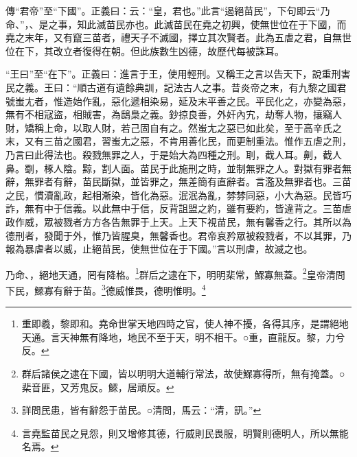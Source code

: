 {\noindent\zhuan{}\fzbyks 傳“君帝”至“下國”。正義曰：云：“皇，君也。”此言“遏絕苗民”，下句即云“乃命、”，、是之事，知此滅苗民亦也。此滅苗民在堯之初興，使無世位在于下國，而堯之末年，又有竄三苗者，禮天子不滅國，擇立其次賢者。此為五虐之君，自無世位在下，其改立者復得在朝。但此族數生凶德，故歷代每被誅耳。 \par}

{\noindent\shu{}\fzkt “王曰”至“在下”。正義曰：進言于王，使用輕刑。又稱王之言以告天下，說重刑害民之義。王曰：“順古道有遺餘典訓，記法古人之事。昔炎帝之末，有九黎之國君號蚩尢者，惟造始作亂，惡化遞相染易，延及末平善之民。平民化之，亦變為惡，無有不相寇盜，相賊害，為鴟梟之義。鈔掠良善，外奸內宄，劫奪人物，攘竊人財，矯稱上命，以取人財，若己固自有之。然蚩尢之惡已如此矣，至于高辛氏之末，又有三苗之國君，習蚩尢之惡，不肯用善化民，而更制重法。惟作五虐之刑，乃言曰此得法也。殺戮無罪之人，于是始大為四種之刑。刵，截人耳。劓，截人鼻。劅，椓人陰。黥，割人面。苗民于此施刑之時，並制無罪之人。對獄有罪者無辭，無罪者有辭，苗民斷獄，並皆罪之，無差簡有直辭者。言濫及無罪者也。三苗之民，慣瀆亂政，起相漸染，皆化為惡。泯泯為亂，棼棼同惡，小大為惡。民皆巧詐，無有中于信義。以此無中于信，反背詛盟之約，雖有要約，皆違背之。三苗虐政作威，眾被戮者方方各告無罪于上天。上天下視苗民，無有馨香之行。其所以為德刑者，發聞于外，惟乃皆腥臭，無馨香也。君帝哀矜眾被殺戮者，不以其罪，乃報為暴虐者以威，止絕苗民，使無世位在于下國。”言以刑虐，故滅之也。 \par}

乃命、，絕地天通，罔有降格。\footnote{重即羲，黎即和。堯命世掌天地四時之官，使人神不擾，各得其序，是謂絕地天通。言天神無有降地，地民不至于天，明不相干。○重，直龍反。黎，力兮反。}群后之逮在下，明明棐常，鰥寡無蓋。\footnote{群后諸侯之逮在下國，皆以明明大道輔行常法，故使鰥寡得所，無有掩蓋。○棐音匪，又芳鬼反。鰥，居頑反。}皇帝清問下民，鰥寡有辭于苗。\footnote{詳問民患，皆有辭怨于苗民。○清問，馬云：“清，訊。”}德威惟畏，德明惟明。\footnote{言堯監苗民之見怨，則又增修其德，行威則民畏服，明賢則德明人，所以無能名焉。}


